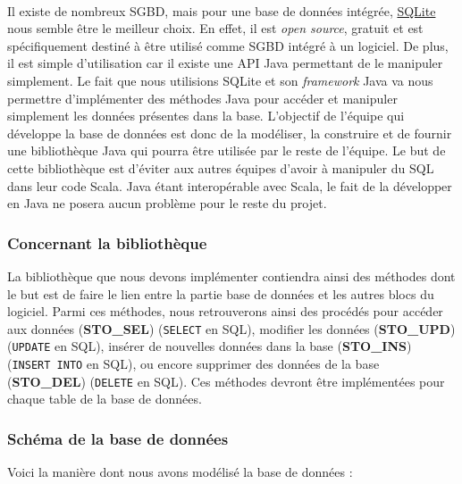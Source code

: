 \paragraph{}
Il existe de nombreux SGBD, mais pour une base de données intégrée,
\href{https://sqlite.org/index.html}{SQLite} nous semble être le meilleur
choix. En effet, il est \textit{open source}, gratuit et est spécifiquement
destiné à être utilisé comme SGBD intégré à un logiciel. De plus, il est
simple d’utilisation car il existe une API Java permettant de le manipuler
simplement. Le fait que nous utilisions SQLite et son
\textit{framework} Java va nous permettre d’implémenter des méthodes Java pour
accéder et manipuler simplement les données présentes dans la base. L’objectif
de l’équipe qui développe la base de données est donc de la modéliser, la
construire et de fournir une bibliothèque Java qui pourra être utilisée par le
reste de l’équipe. Le but de cette bibliothèque est d’éviter aux autres équipes
d’avoir à manipuler du SQL dans leur code Scala. Java étant interopérable avec
Scala, le fait de la développer en Java ne posera aucun problème pour le reste
du projet.

\subsubsection{Concernant la bibliothèque}

La bibliothèque que nous devons implémenter contiendra ainsi des méthodes dont
le but est de faire le lien entre la partie base de données et les autres
blocs du logiciel. Parmi ces méthodes, nous retrouverons ainsi des procédés
pour accéder aux données (\textbf{STO\_SEL}) (\texttt{SELECT} en SQL),
modifier les données (\textbf{STO\_UPD}) (\texttt{UPDATE} en SQL), insérer de
nouvelles données dans la base (\textbf{STO\_INS}) (\texttt{INSERT INTO} en
SQL), ou encore supprimer des données de la base (\textbf{STO\_DEL})
(\texttt{DELETE} en SQL). Ces méthodes devront être implémentées pour chaque
table de la base de données.

\subsubsection{Schéma de la base de données}

Voici la manière dont nous avons modélisé la base de données :

\paragraph{}

